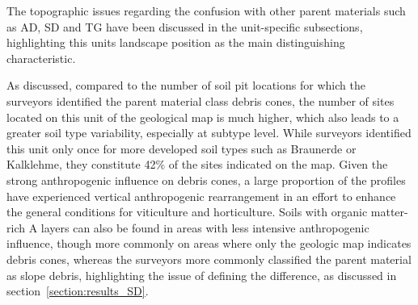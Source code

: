 \documentclass[preprint,12pt,authoryear]{elsarticle}
\begin{document}
The topographic issues regarding the confusion with other parent materials such as AD, SD and TG have been discussed in the unit-specific subsections, highlighting this units landscape position as the main distinguishing characteristic.

As discussed, compared to the number of soil pit locations for which the surveyors identified the parent material class debris cones, the number of sites located on this unit of the geological map is much higher, which also leads to a greater soil type variability, especially at subtype level. While surveyors identified this unit only once for more developed soil types such as Braunerde or Kalklehme, they constitute 42\% of the sites indicated on the map. Given the strong anthropogenic influence on debris cones, a large proportion of the profiles have experienced vertical anthropogenic rearrangement in an effort to enhance the general conditions for viticulture and horticulture. Soils with organic matter-rich A layers can also be found in areas with less intensive anthropogenic influence, though more commonly on areas where only the geologic map indicates debris cones, whereas the surveyors more commonly classified the parent material as slope debris, highlighting the issue of defining the difference, as discussed in section~\ref{section:results_SD}.
\end{document}
